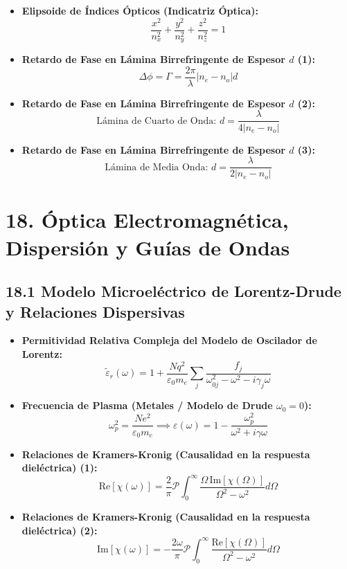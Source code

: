 \documentclass[11pt,a4paper]{article}
\begin{document}
\begin{itemize}
  \item \textbf{Elipsoide de Índices Ópticos (Indicatriz Óptica):}
  \[
    \frac{x^2}{n_x^2} + \frac{y^2}{n_y^2} + \frac{z^2}{n_z^2} = 1
  \]
  \item \textbf{Retardo de Fase en Lámina Birrefringente de Espesor $d$ (1):}
  \[
    \Delta\phi = \Gamma = \frac{2\pi}{\lambda} |n_e - n_o| d
  \]
  \item \textbf{Retardo de Fase en Lámina Birrefringente de Espesor $d$ (2):}
  \[
    \text{Lámina de Cuarto de Onda: } d = \frac{\lambda}{4|n_e - n_o|}
  \]
  \item \textbf{Retardo de Fase en Lámina Birrefringente de Espesor $d$ (3):}
  \[
    \text{Lámina de Media Onda: } d = \frac{\lambda}{2|n_e - n_o|}
  \]
\end{itemize}

\section*{18. Óptica Electromagnética, Dispersión y Guías de Ondas}

\subsection*{18.1 Modelo Microeléctrico de Lorentz-Drude y Relaciones Dispersivas}

\begin{itemize}
  \item \textbf{Permitividad Relativa Compleja del Modelo de Oscilador de Lorentz:}
  \[
    \tilde{\varepsilon}_r(\omega) = 1 + \frac{N q^2}{\varepsilon_0 m_e} \sum_j \frac{f_j}{\omega_{0j}^2 - \omega^2 - i\gamma_j \omega}
  \]
  \item \textbf{Frecuencia de Plasma (Metales / Modelo de Drude $\omega_{0} = 0$):}
  \[
    \omega_p^2 = \frac{N e^2}{\varepsilon_0 m_e} \implies \varepsilon(\omega) = 1 - \frac{\omega_p^2}{\omega^2 + i\gamma\omega}
  \]
  \item \textbf{Relaciones de Kramers-Kronig (Causalidad en la respuesta dieléctrica) (1):}
  \[
    \mathrm{Re}[\chi(\omega)] = \frac{2}{\pi} \mathcal{P} \int_0^\infty \frac{\Omega \, \mathrm{Im}[\chi(\Omega)]}{\Omega^2 - \omega^2} d\Omega
  \]
  \item \textbf{Relaciones de Kramers-Kronig (Causalidad en la respuesta dieléctrica) (2):}
  \[
    \mathrm{Im}[\chi(\omega)] = -\frac{2\omega}{\pi} \mathcal{P} \int_0^\infty \frac{\mathrm{Re}[\chi(\Omega)]}{\Omega^2 - \omega^2} d\Omega
  \]
\end{itemize}
\end{document}
